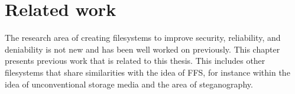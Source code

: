 \chapter{Related work}
\label{ch:related_work}
The research area of creating filesystems to improve security, reliability, and deniability is not new and has been well worked on previously. This chapter presents previous work that is related to this thesis. This includes other filesystems that share similarities with the idea of FFS, for instance within the idea of unconventional storage media and the area of steganography.









